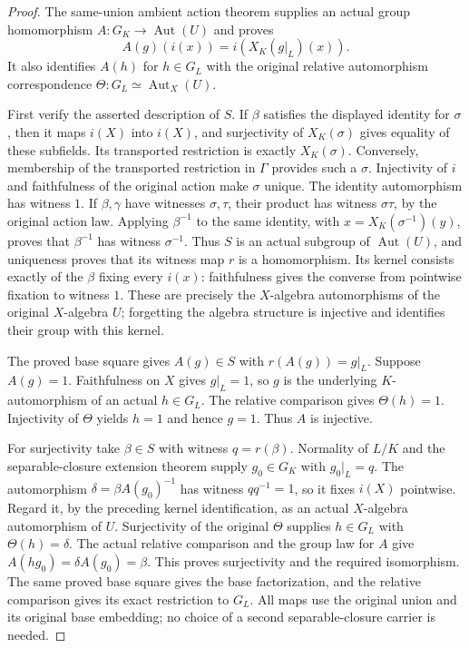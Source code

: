 \begin{proof}
The same-union ambient action theorem supplies an actual group
homomorphism $A:G_K\longrightarrow\operatorname{Aut}(U)$ and proves
\[
 A(g)(i(x))=i(X_K(g|_L)(x)).
\]
It also identifies $A(h)$ for $h\in G_L$ with the original
relative automorphism correspondence
$\Theta:G_L\simeq\operatorname{Aut}_X(U)$.

First verify the asserted description of $S$. If $\beta$ satisfies
the displayed identity for $\sigma$, then it maps $i(X)$ into
$i(X)$, and surjectivity of $X_K(\sigma)$ gives equality of these
subfields. Its transported restriction is exactly $X_K(\sigma)$.
Conversely, membership of the transported restriction in $\Gamma$
provides such a $\sigma$. Injectivity of $i$ and faithfulness of the
original action make $\sigma$ unique. The identity automorphism has
witness $1$. If $\beta,\gamma$ have witnesses $\sigma,\tau$, their
product has witness $\sigma\tau$, by the original action law.
Applying $\beta^{-1}$ to the same identity, with
$x=X_K(\sigma^{-1})(y)$, proves that $\beta^{-1}$ has witness
$\sigma^{-1}$. Thus $S$ is an actual subgroup of
$\operatorname{Aut}(U)$, and uniqueness proves that its witness map
$r$ is a homomorphism. Its kernel consists exactly of the
$\beta$ fixing every $i(x)$: faithfulness gives the converse from
pointwise fixation to witness $1$. These are precisely the
$X$-algebra automorphisms of the original $X$-algebra $U$;
forgetting the algebra structure is injective and identifies their
group with this kernel.

The proved base square gives $A(g)\in S$ with
$r(A(g))=g|_L$. Suppose $A(g)=1$. Faithfulness on $X$ gives
$g|_L=1$, so $g$ is the underlying $K$-automorphism of an actual
$h\in G_L$. The relative comparison gives $\Theta(h)=1$.
Injectivity of $\Theta$ yields $h=1$ and hence $g=1$.
Thus $A$ is injective.

For surjectivity take $\beta\in S$ with witness $q=r(\beta)$.
Normality of $L/K$ and the separable-closure extension theorem
supply $g_0\in G_K$ with $g_0|_L=q$. The automorphism
$\delta=\beta A(g_0)^{-1}$ has witness $qq^{-1}=1$, so it fixes
$i(X)$ pointwise. Regard it, by the preceding kernel
identification, as an actual $X$-algebra automorphism of $U$.
Surjectivity of the original $\Theta$ supplies $h\in G_L$ with
$\Theta(h)=\delta$. The actual relative comparison and the group
law for $A$ give $A(hg_0)=\delta A(g_0)=\beta$.
This proves surjectivity and the required isomorphism.
The same proved base square gives the base factorization, and the
relative comparison gives its exact restriction to $G_L$.
All maps use the original union and its original base embedding;
no choice of a second separable-closure carrier is needed.
\end{proof}
